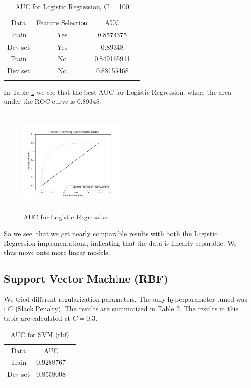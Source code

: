 \documentclass[conference]{IEEEtran}
\numberwithin{equation}{section}
\numberwithin{figure}{section}
\numberwithin{table}{section}
\begin{document}
\begin{table}[!htb]
 \centering
 \caption{AUC for Logistic Regression, C = 100}
 \label{tab_lr2}
\begin{tabular}{ c c c c } 
	    \noalign{\smallskip}\hline\noalign{\smallskip}
		Data &  Feature Selection & AUC \\
    	   \noalign{\smallskip}\hline\noalign{\smallskip}
		Train &  Yes & 0.8574375\\
		Dev set & Yes & 0.89348\\
		\noalign{\smallskip}\hline\noalign{\smallskip}
		Train &  No & 0.849165911\\
		Dev set & No & 0.88155468\\
		\noalign{\smallskip}\hline\noalign{\smallskip}	
  \end{tabular} 
\end{table}

In Table \ref{tab_lr2} we see that the best AUC for Logistic Regression, where the area under the ROC curve is 0.89348.

\begin{figure}
\centering
  \includegraphics[width=200px, height = 200px]{lr_}
  \caption{AUC for Logistic Regression}
  \label{lr_fig}
\end{figure}

So we see, that we get nearly comparable results with both the Logistic Regression implementations, indicating that the data is linearly separable. We thus move onto more linear models.

\subsection{Support Vector Machine (RBF)}
We tried different regularization parameters. The only hyperparameter tuned was : \textit{$C$} (Slack Penalty). The results are summarized in Table \ref{tab_svm2}. The results in this table are calculated at $C = 0.3$.

\begin{table}[!htb]
 \centering
 \caption{AUC for SVM (rbf)}
 \label{tab_svm2}
\begin{tabular}{ c c c } 
	    \noalign{\smallskip}\hline\noalign{\smallskip}
		Data &   AUC \\
    	   \noalign{\smallskip}\hline\noalign{\smallskip}
		Train & 0.9288767\\
		Dev set & 0.8558008\\
				\noalign{\smallskip}\hline\noalign{\smallskip}	
  \end{tabular} 
\end{table}
\end{document}
